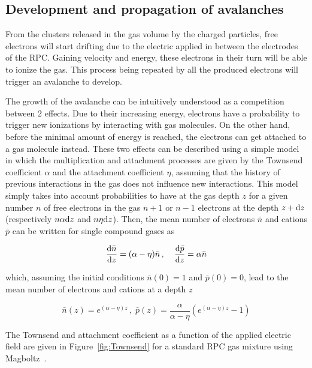 	\subsection{Development and propagation of avalanches}
	\label{chapt4:ssec:avalanche}
	
	From the clusters released in the gas volume by the charged particles, free electrons will start drifting due to the electric applied in between the electrodes of the RPC. Gaining velocity and energy, these electrons in their turn will be able to ionize the gas. This process being repeated by all the produced electrons will trigger an avalanche to develop.
	
	The growth of the avalanche can be intuitively understood as a competition between 2 effects. Due to their increasing energy, electrons have a probability to trigger new ionizations by interacting with gas molecules. On the other hand, before the minimal amount of energy is reached, the electrons can get attached to a gas molecule instead. These two effects can be described using a simple model in which the multiplication and attachment processes are given by the Townsend coefficient $\alpha$ and the attachment coefficient $\eta$, assuming that the history of previous interactions in the gas does not influence new interactions. This model simply takes into account probabilities to have at the gas depth $z$ for a given number $n$ of free electrons in the gas $n+1$ or $n-1$ electrons  at the depth $z+\mathrm{d} z$ (respectively $n\alpha\mathrm{d} z$ and $n\eta\mathrm{d} z$). Then, the mean number of electrons $\bar{n}$ and cations $\bar{p}$ can be written for single compound gases as
	
	\begin{equation}
	\label{eq:townsend}
	\frac{\mathrm{d}\bar{n}}{\mathrm{d} z} = (\alpha - \eta)\bar{n} \, , \;\;\;\; \frac{\mathrm{d}\bar{p}}{\mathrm{d} z} = \alpha\bar{n}
	\end{equation}
	
	which, assuming the initial conditions $\bar{n}(0) = 1$ and $\bar{p}(0) = 0$, lead to the mean number of electrons and cations at a depth $z$
	
	\begin{equation}
	\label{eq:Townsend-avalanche}
	\bar{n}(z) = e^{(\alpha - \eta)z} \, , \; \bar{p}(z) = \frac{\alpha}{\alpha - \eta}\left( e^{(\alpha - \eta)z} - 1\right)
	\end{equation}
	
	The Townsend and attachment coefficient as a function of the applied electric field are given in Figure~\ref{fig:Townsend} for a standard RPC gas mixture using Magboltz~\cite{MAGBOLTZ}.
	
